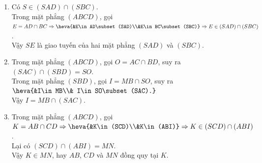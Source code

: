 \begin{bt}
{\begin{center}
		\end{center}
		\begin{enumerate}
			\item Có $S\in (SAD)\cap (SBC)$.\\
			Trong mặt phẳng $(ABCD)$, gọi $E=AD\cap BC\Rightarrow \heva{&E\in AD\subset (SAD)\\&E\in BC\subset (SBC)}\Rightarrow E\in (SAD)\cap (SBC)$.\\
			Vậy $SE$ là giao tuyến của hai mặt phẳng $(SAD)$ và $(SBC)$. 
			\item Trong mặt phẳng $(ABCD)$, gọi $O=AC\cap BD$, suy ra $(SAC)\cap (SBD)=SO$.\\
			Trong mặt phẳng $(SBD)$, gọi $I=MB\cap SO$, suy ra $\heva{&I\in MB\\& I\in SO\subset (SAC).}$\\ Vậy $I=MB\cap (SAC)$.
			\item Trong mặt phẳng $(ABCD)$, gọi $K=AB\cap CD\Rightarrow \heva{&K\in (SCD)\\&K\in (ABI)}\Rightarrow K\in (SCD)\cap (ABI)$.\\
			Lại có $(SCD)\cap (ABI)=MN$.\\
			Vậy $K\in MN$, hay $AB$, $CD$ và $MN$ đồng quy tại $K$.
		\end{enumerate}
	}
\end{bt}

